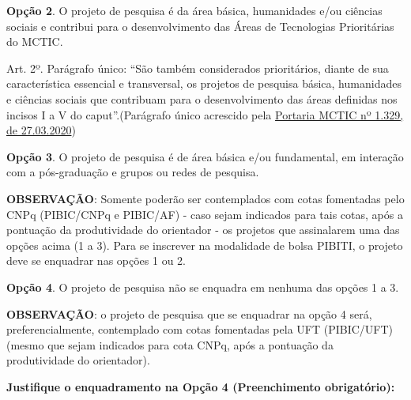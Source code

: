 \documentclass[12pt, consuni, professor]{uftpibic}
\newcommand{\ko}{\makebox[0pt][l]{(\ \ \ )}\raisebox{.15ex}{\hspace{0.1em}$\qquad$}}
\theoremstyle{plain}
\begin{document}
\ko \textbf{Opção 2}. O projeto de pesquisa é da área básica, humanidades e/ou ciências sociais e contribui para o desenvolvimento das Áreas de Tecnologias Prioritárias do MCTIC.


Art. 2º. Parágrafo único: ``São também considerados prioritários, diante de sua característica essencial e transversal, os projetos de pesquisa básica, humanidades e ciências sociais que contribuam para o desenvolvimento das áreas definidas nos incisos I a V do caput''.(Parágrafo único acrescido pela \href{http://www.in.gov.br/en/web/dou/-/portaria-n-1.329-de-27-de-marco-de-2020-250263672}{Portaria MCTIC nº 1.329, de 27.03.2020})

\bigbreak

\ko \textbf{Opção 3}. O projeto de pesquisa é de área básica e/ou fundamental, em interação com a pós-graduação e grupos ou redes de pesquisa.

\bigbreak

\textbf{OBSERVAÇÃO}: Somente poderão ser contemplados com cotas fomentadas pelo CNPq (PIBIC/CNPq e PIBIC/AF) - caso sejam indicados para tais cotas, após a pontuação da produtividade do orientador - os projetos que assinalarem uma das opções acima (1 a 3). Para se inscrever na modalidade de bolsa PIBITI, o projeto deve se enquadrar nas opções 1 ou 2.

\bigbreak

\ko \textbf{Opção 4}. O projeto de pesquisa não se enquadra em nenhuma das opções 1 a 3.

\bigbreak

\textbf{OBSERVAÇÃO}: o projeto de pesquisa que se enquadrar na opção 4 será, preferencialmente, contemplado com cotas fomentadas pela UFT (PIBIC/UFT) (mesmo que sejam indicados para cota CNPq, após a pontuação da produtividade do orientador).
\bigbreak

\textbf{Justifique o enquadramento na Opção 4 (Preenchimento obrigatório):}

\noindent\makebox[\linewidth]{\rule{\textwidth}{.5pt}}

\noindent\makebox[\linewidth]{\rule{\textwidth}{.5pt}}

\noindent\makebox[\linewidth]{\rule{\textwidth}{.5pt}}

\noindent\makebox[\linewidth]{\rule{\textwidth}{.5pt}}

\noindent\makebox[\linewidth]{\rule{\textwidth}{.5pt}}

\vspace{2cm}
\setlength{\parindent}{1.5cm}
\end{document}
